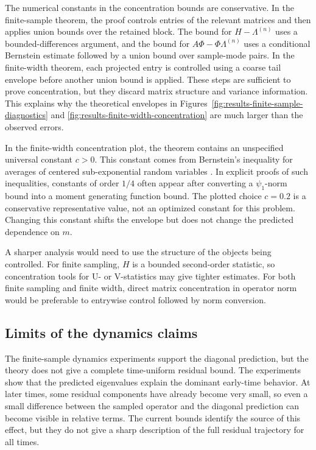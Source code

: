 The numerical constants in the concentration bounds are conservative. In the
finite-sample theorem, the proof controls entries of the relevant matrices and
then applies union bounds over the retained block. The bound for
\(H-\Lambda^{(n)}\) uses a bounded-differences argument, and the bound for
\(A\Phi-\Phi\Lambda^{(n)}\) uses a conditional Bernstein estimate followed by a
union bound over sample-mode pairs. In the finite-width theorem, each projected
entry is controlled using a coarse tail envelope before another union bound is
applied. These steps are sufficient to prove concentration, but they discard
matrix structure and variance information. This explains why the theoretical
envelopes in Figures~\ref{fig:results-finite-sample-diagnostics} and
\ref{fig:results-finite-width-concentration} are much larger than the observed
errors.

In the finite-width concentration plot, the theorem contains an unspecified
universal constant \(c>0\). This constant comes from Bernstein's inequality for
averages of centered sub-exponential random variables
\citep{Vershynin_2018a}. In explicit proofs of such inequalities, constants of
order \(1/4\) often appear after converting a \(\psi_1\)-norm bound into a
moment generating function bound. The plotted choice \(c=0.2\) is a conservative
representative value, not an optimized constant for this problem. Changing this
constant shifts the envelope but does not change the predicted dependence on
\(m\).

A sharper analysis would need to use the structure of the objects being
controlled. For finite sampling, \(H\) is a bounded second-order statistic, so
concentration tools for U- or V-statistics may give tighter estimates. For both
finite sampling and finite width, direct matrix concentration in operator norm
would be preferable to entrywise control followed by norm conversion.

\subsection{Limits of the dynamics claims}
\label{subsec:discussion-limitations-dynamics}

The finite-sample dynamics experiments support the diagonal prediction, but the
theory does not give a complete time-uniform residual bound. The experiments
show that the predicted eigenvalues explain the dominant early-time behavior.
At later times, some residual components have already become very small, so even
a small difference between the sampled operator and the diagonal prediction can
become visible in relative terms. The current bounds identify the source of this
effect, but they do not give a sharp description of the full residual trajectory
for all times.

